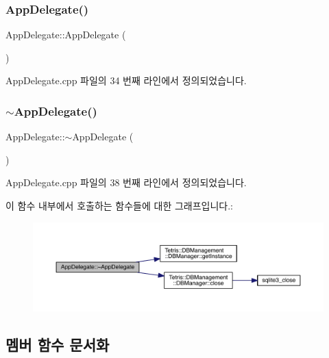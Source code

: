 \subsubsection{\texorpdfstring{App\+Delegate()}{AppDelegate()}}
{\footnotesize\ttfamily App\+Delegate\+::\+App\+Delegate (\begin{DoxyParamCaption}{ }\end{DoxyParamCaption})}



App\+Delegate.\+cpp 파일의 34 번째 라인에서 정의되었습니다.

\mbox{\label{class_app_delegate_a9f89424b5e296e3668deaa0265fc5ac1}} 
\subsubsection{\texorpdfstring{$\sim$\+App\+Delegate()}{~AppDelegate()}}
{\footnotesize\ttfamily App\+Delegate\+::$\sim$\+App\+Delegate (\begin{DoxyParamCaption}{ }\end{DoxyParamCaption})\hspace{0.3cm}{\ttfamily [virtual]}}



App\+Delegate.\+cpp 파일의 38 번째 라인에서 정의되었습니다.

이 함수 내부에서 호출하는 함수들에 대한 그래프입니다.\+:
\nopagebreak
\begin{figure}[H]
\begin{center}
\leavevmode
\includegraphics[width=350pt]{class_app_delegate_a9f89424b5e296e3668deaa0265fc5ac1_cgraph}
\end{center}
\end{figure}


\subsection{멤버 함수 문서화}
\mbox{\label{class_app_delegate_a17cb09777419781698324e0415bffd3a}} 
